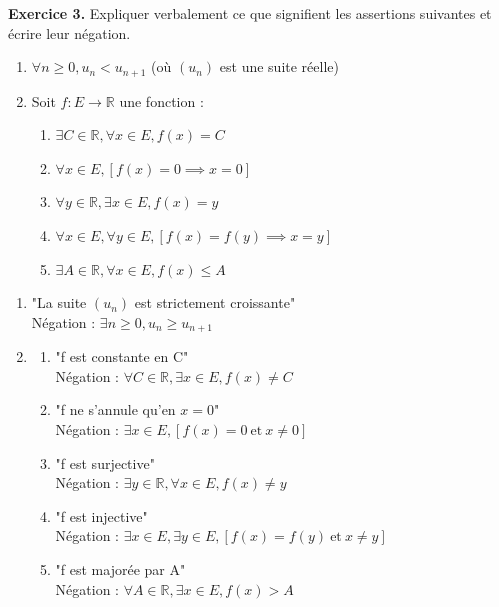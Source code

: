 \documentclass[a4paper, 10pt]{report}
\begin{document}
	\newpage
	
	\noindent
	\textbf{Exercice 3.} Expliquer verbalement ce que signifient les
	assertions suivantes et écrire leur négation.
	
	\begin{enumerate}[label=(\roman*)]
		\item $\forall n \geq 0, u_n < u_{n+1}$
		(où $(u_n)$ est une suite réelle)
		\item Soit $f : E \to \mathbb{R}$ une fonction :
		\begin{enumerate}[label=(\alph*)]
			\item $\exists C \in \mathbb{R},
				\forall x \in E,
				f(x) = C$
			\item $\forall x \in E,
				[f(x) = 0 \implies x = 0]$
			\item $\forall y \in \mathbb{R},
				\exists x \in E,
				f(x) = y$
			\item $\forall x \in E,
				\forall y \in E,
				[f(x) = f(y) \implies x = y]$
			\item $\exists A \in \mathbb{R},
				\forall x \in E,
				f(x) \leq A$
		\end{enumerate}
	\end{enumerate}
	
	\colorbox{solution}
	{
		\begin{minipage}{0.9\textwidth}
			\begin{enumerate}[label=(\roman*)]
				\item "La suite $(u_n)$ est strictement croissante"\\
				Négation : $\exists n \geq 0, u_n \geq u_{n+1}$
				\item \begin{enumerate}[label=(\alph*)]
					\item "f est constante en C"\\
					Négation : $\forall C \in \mathbb{R},
						\exists x \in E,
						f(x) \neq C$
					\item "f ne s'annule qu'en $x = 0$"\\
					Négation : $\exists x \in E,
						[f(x) = 0 \ \text{et}\ x \neq 0]$
					\item "f est surjective"\\
					Négation : $\exists y \in \mathbb{R},
						\forall x \in E,
						f(x) \neq y$
					\item "f est injective"\\
					Négation :  $\exists x \in E,
						\exists y \in E,
						[f(x) = f(y) \ \text{et}\ x \neq y]$
					\item "f est majorée par A"\\
					Négation : $\forall A \in \mathbb{R},
						\exists x \in E,
						f(x) > A$
				\end{enumerate}
			\end{enumerate}
		\end{minipage}
	}
	
\end{document}
